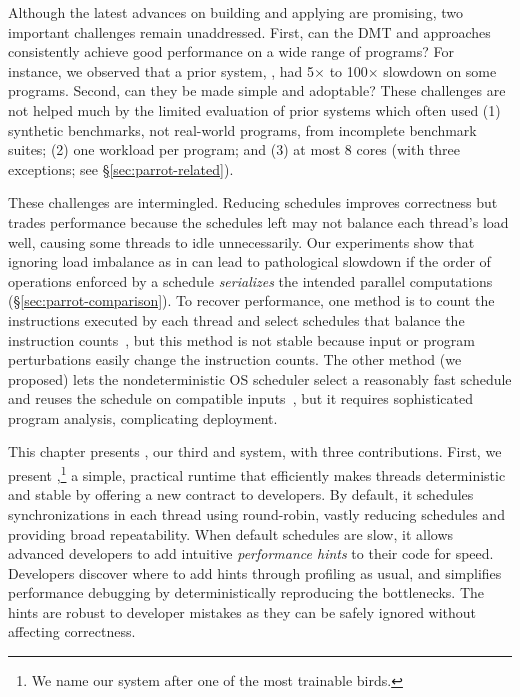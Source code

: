 Although the latest advances on building and applying \smt are promising, two important challenges remain
unaddressed.  First, can the DMT and \smt approaches consistently achieve
good performance on a wide range of programs?  For instance, we observed
that a prior system, \dthreads, had 5$\times$ to 100$\times$ slowdown on
some programs.  Second, can they be made simple and adoptable?
These challenges are not helped much by the limited
evaluation of prior systems which often used (1) synthetic benchmarks, not
real-world programs, from incomplete benchmark suites; (2) one workload
per program; and (3) at most 8 cores (with three exceptions; see
\S\ref{sec:parrot-related}).

These challenges are intermingled.  Reducing schedules improves correctness
but trades performance because the schedules left may not balance each
thread's load well, causing some threads to idle unnecessarily.  Our
experiments show that ignoring load imbalance as in \dthreads
can lead to pathological
slowdown if the order of operations enforced by a schedule
\emph{serializes} the intended parallel computations
(\S\ref{sec:parrot-comparison}).  To recover performance, one method is to count
the instructions executed by each thread and select schedules that balance
the instruction counts~\cite{kendo:asplos09, coredet:asplos10,
  dmp:asplos09}, but this method is not stable because input or program
perturbations easily change the instruction counts.  The other method (we
proposed)
lets the nondeterministic OS scheduler select
a reasonably fast schedule and reuses the schedule on
compatible inputs~\cite{cui:tern:osdi10,peregrine:sosp11}, but it
requires sophisticated program analysis, complicating deployment.



This chapter presents \parrot, our third \smt and \dmt system, with three contributions.
First, we present \parrot,\footnote{We name our system after one of the most
  trainable birds.} a simple, practical runtime that efficiently makes
threads deterministic and stable by offering a new contract to developers.
By default, it schedules synchronizations in each thread using
round-robin, vastly reducing schedules and providing broad repeatability.
When default schedules are slow, it allows advanced developers to add
intuitive \emph{performance hints} to their code for speed.  Developers discover
where to add hints through profiling as usual, and \parrot simplifies
performance debugging by deterministically reproducing the bottlenecks.
The hints are robust to developer mistakes as they can be safely ignored
without affecting correctness.

